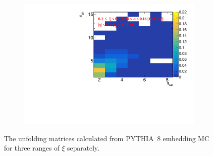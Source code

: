\begin{figure}[t!]
\begin{subfigure}{.49\textwidth}
		\includegraphics[width=\textwidth,page=1]{chapters/chrgSTAR/img/unfolding/matrix_2.pdf}
	\end{subfigure}
	\hfill
	\begin{minipage}{.47\textwidth}
		\caption{The unfolding matrices calculated  from PYTHIA~8 embedding MC for three ranges of $\xi$ separately.}
		\label{fig:responseSTAR}
	\end{minipage}
\end{figure}

